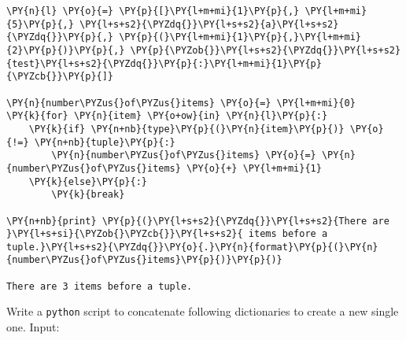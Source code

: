 \begin{Answer}
\begin{codebox}[size=fbox, boxrule=1pt, colback=cellbackground, colframe=cellborder]
\begin{Verbatim}[commandchars=\\\{\}]
\PY{n}{l} \PY{o}{=} \PY{p}{[}\PY{l+m+mi}{1}\PY{p}{,} \PY{l+m+mi}{5}\PY{p}{,} \PY{l+s+s2}{\PYZdq{}}\PY{l+s+s2}{a}\PY{l+s+s2}{\PYZdq{}}\PY{p}{,} \PY{p}{(}\PY{l+m+mi}{1}\PY{p}{,}\PY{l+m+mi}{2}\PY{p}{)}\PY{p}{,} \PY{p}{\PYZob{}}\PY{l+s+s2}{\PYZdq{}}\PY{l+s+s2}{test}\PY{l+s+s2}{\PYZdq{}}\PY{p}{:}\PY{l+m+mi}{1}\PY{p}{\PYZcb{}}\PY{p}{]}

\PY{n}{number\PYZus{}of\PYZus{}items} \PY{o}{=} \PY{l+m+mi}{0}
\PY{k}{for} \PY{n}{item} \PY{o+ow}{in} \PY{n}{l}\PY{p}{:}
    \PY{k}{if} \PY{n+nb}{type}\PY{p}{(}\PY{n}{item}\PY{p}{)} \PY{o}{!=} \PY{n+nb}{tuple}\PY{p}{:}
        \PY{n}{number\PYZus{}of\PYZus{}items} \PY{o}{=} \PY{n}{number\PYZus{}of\PYZus{}items} \PY{o}{+} \PY{l+m+mi}{1}
    \PY{k}{else}\PY{p}{:}
        \PY{k}{break}
        
\PY{n+nb}{print} \PY{p}{(}\PY{l+s+s2}{\PYZdq{}}\PY{l+s+s2}{There are }\PY{l+s+si}{\PYZob{}\PYZcb{}}\PY{l+s+s2}{ items before a tuple.}\PY{l+s+s2}{\PYZdq{}}\PY{o}{.}\PY{n}{format}\PY{p}{(}\PY{n}{number\PYZus{}of\PYZus{}items}\PY{p}{)}\PY{p}{)}

There are 3 items before a tuple.
\end{Verbatim}
\end{codebox}
\end{Answer}

\begin{Exercise}
Write a \texttt{python} script to concatenate following dictionaries to create a new single one.
Input:
\begin{Shaded}
\begin{Highlighting}[]
\OperatorTok{=}\NormalTok{\{}\NormalTok{:}\NormalTok{, }\NormalTok{:}\NormalTok{\}}
\OperatorTok{=}\NormalTok{\{}\NormalTok{:}\NormalTok{, }\NormalTok{:}\NormalTok{\}}
\OperatorTok{=}\NormalTok{\{}\NormalTok{:}\NormalTok{, }\NormalTok{:}\NormalTok{\}}
\end{Highlighting}
\end{Shaded}
\end{Exercise}

